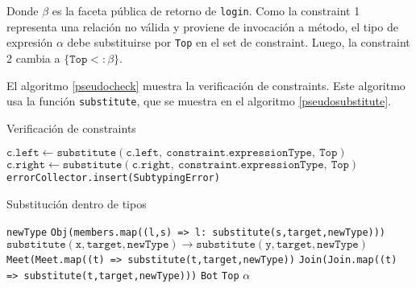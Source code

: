 Donde $\beta$ es la faceta pública de retorno de \texttt{login}. Como la constraint 1 representa una relación no válida y proviene de invocación a método, el tipo de expresión $\alpha$ debe substituirse por \texttt{Top} en el set de constraint. Luego, la constraint 2 cambia a $\{\mathtt{Top <: \beta}\}$.

El algoritmo \ref{pseudocheck} muestra la verificación de constraints. Este algoritmo usa la función \texttt{substitute}, que se muestra en el algoritmo \ref{pseudosubstitute}.

\begin{algorithm}\captionsetup{labelsep=newline}
  \centering
  \caption{Verificación de constraints}
  \label{pseudocheck}
    \begin{algorithmic}[1]
                \State $\mathtt{c.left\gets substitute(c.left,\ constraint.expressionType,\ Top)}$
                \State $\mathtt{c.right\gets substitute(c.right,\ constraint.expressionType,\ Top)}$
              \EndFor
              \State \texttt{errorCollector.insert(SubtypingError)}
            \EndIf
          \EndFor
      \EndFunction
    \end{algorithmic}
\end{algorithm}

\begin{algorithm}\captionsetup{labelsep=newline}
  \centering
  \caption{Substitución dentro de tipos}
  \label{pseudosubstitute}
    \begin{algorithmic}[1]
            \State \Return \texttt{newType}
          \EndIf
              \State \Return \texttt{Obj(members.map((l,s) => {l: substitute(s,target,newType)}))}
            \EndCase
              \State \Return $\mathtt{substitute(x,target,newType)\rightarrow substitute(y,target,newType)}$
            \EndCase
              \State \Return \texttt{Meet(Meet.map((t) => substitute(t,target,newType))}
            \EndCase
              \State \Return \texttt{Join(Join.map((t) => substitute(t,target,newType)))}
            \EndCase
              \State \Return \texttt{Bot}
            \EndCase
              \State \Return \texttt{Top}
            \EndCase
            \Case{$\alpha$}
              \State \Return $\alpha$
            \EndCase
          \EndSwitch
      \EndFunction
    \end{algorithmic}
\end{algorithm}

